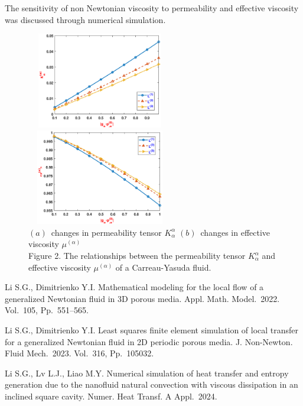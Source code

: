 \documentclass[12pt]{llncs}
\begin{document}
The sensitivity of non Newtonian viscosity to permeability and effective viscosity was discussed through numerical simulation.
\begin{figure}[htp]
\centering
\includegraphics[width=6.4cm,height=4.2cm]{2_1.eps}
\includegraphics[width=6.4cm,height=4.2cm]{2_2.eps}\\
$(a)$\ changes in permeability tensor $K_{\alpha}^{\alpha}$\quad\quad\quad
$(b)$\ changes in effective viscosity $\mu^{(\alpha)}$\\
\small{Figure 2. The relationships between the permeability tensor $K_{\alpha}^{\alpha}$
and effective viscosity $\mu^{(\alpha)}$  of a Carreau-Yasuda fluid.}
\end{figure}


\begin{thebibliography}{9} %
 Li S.G., Dimitrienko Y.I.
    Mathematical modeling for the local flow of a generalized Newtonian fluid in 3D porous media.
    Appl. Math. Model.~2022. Vol.~105, Pp.~551--565. %

 Li S.G., Dimitrienko Y.I.
    Least squares finite element simulation of local transfer for a generalized Newtonian fluid in 2D periodic porous media.
    J. Non-Newton. Fluid Mech.~2023. Vol.~316, Pp.~105032. %

 Li S.G., Lv L.J., Liao M.Y. Numerical simulation of heat transfer and entropy generation due to the nanofluid natural convection with viscous dissipation in an inclined square cavity. Numer. Heat Transf. A Appl.~2024. %
\end{thebibliography}
\end{document}
